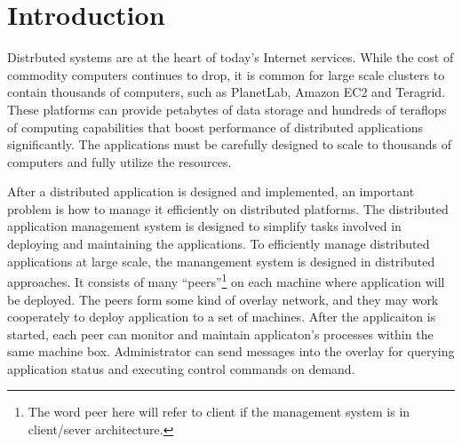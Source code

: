 \section{Introduction}

Distrbuted systems are at the heart of today's Internet
services. While the cost of commodity computers continues to
drop, it is common for large scale clusters to contain
thousands of computers, such as PlanetLab, Amazon EC2 and
Teragrid. These platforms can provide petabytes of data
storage and hundreds of teraflops of computing capabilities
that boost performance of distributed applications
significantly. The applications must be carefully designed
to scale to thousands of computers and fully utilize the
resources.

After a distributed application is designed and implemented,
an important problem is how to manage it efficiently on
distributed platforms.
The distributed application management system is designed to
simplify tasks involved in deploying and maintaining the
applications. To efficiently manage distributed applications
at large scale, the manangement system is designed in
distributed approaches. It consists of many
``peers''\footnote{The word peer here will refer to client
if the management system is in client/sever architecture.}
on each machine where application will be deployed. The
peers form some kind of overlay network, and they may work
cooperately to deploy application to a set of machines.
After the applicaiton is started, each peer can monitor and
maintain applicaton's processes within the same machine box.
Administrator can send messages into the overlay for
querying application status and executing control commands
on demand.

